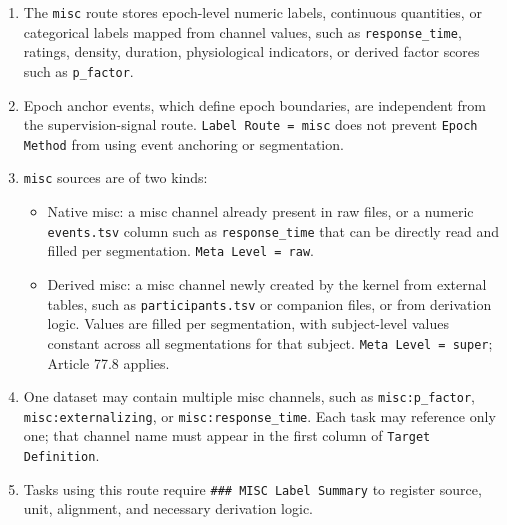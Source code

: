 \begin{tcolorbox}
\begin{enumerate}[leftmargin=1.5em,noitemsep,topsep=2pt]
\item The \texttt{misc} route stores epoch-level numeric labels, continuous quantities, or categorical labels mapped from channel values, such as \texttt{response\_time}, ratings, density, duration, physiological indicators, or derived factor scores such as \texttt{p\_factor}.
\item Epoch anchor events, which define epoch boundaries, are independent from the supervision-signal route. \texttt{Label Route = misc} does not prevent \texttt{Epoch Method} from using event anchoring or segmentation.
\item \texttt{misc} sources are of two kinds:
\begin{itemize}[leftmargin=1.2em,noitemsep,topsep=1pt]
\item Native misc: a misc channel already present in raw files, or a numeric \texttt{events.tsv} column such as \texttt{response\_time} that can be directly read and filled per segmentation. \texttt{Meta Level = raw}.
\item Derived misc: a misc channel newly created by the kernel from external tables, such as \texttt{participants.tsv} or companion files, or from derivation logic. Values are filled per segmentation, with subject-level values constant across all segmentations for that subject. \texttt{Meta Level = super}; Article 77.8 applies.
\end{itemize}
\item One dataset may contain multiple misc channels, such as \texttt{misc:p\_factor}, \texttt{misc:externalizing}, or \texttt{misc:response\_time}. Each task may reference only one; that channel name must appear in the first column of \texttt{Target Definition}.
\item Tasks using this route require \texttt{\#\#\# MISC Label Summary} to register source, unit, alignment, and necessary derivation logic.
\end{enumerate}

\smallskip{}\par\smallskip


\end{tcolorbox}

